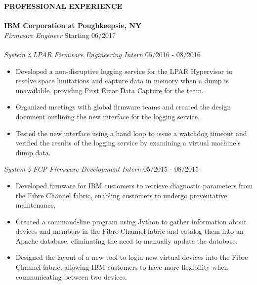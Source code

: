 \documentclass[10.5pt]{res}
\newcommand{\sectionSpace}{\vspace{-3pt}}
\newcommand{\itemSpace}{\vspace{-8pt}}
\begin{document}
\begin{resume}
\textbf{PROFESSIONAL EXPERIENCE} \\ [-10.5pt]
\makebox[\linewidth]{\rule{\textwidth}{0.4pt}}\\
\textbf{IBM Corporation at Poughkeepsie, NY} \\
{\it Firmware Engineer} \hfill Starting 06/2017 \\
{\vspace{-11pt}} \\
{\it System z LPAR Firmware Engineering Intern} \hfill 05/2016 - 08/2016 \\ [-11pt]  
	\begin{itemize} \itemsep -1pt %
	\item  Developed a non-disruptive logging service for the LPAR Hypervisor to resolve space limitations and capture data in memory when a dump is unavailable, providing First Error Data Capture for the team.  
 	\item Organized meetings with global firmware teams and created the design document outlining the new interface for the logging service.         
	\item Tested the new interface using a hand loop to issue a watchdog timeout and verified the results of the logging service by examining a virtual machine’s dump data.
	\end{itemize}
	\itemSpace
{\it System z FCP Firmware Development Intern} \hfill 05/2015 - 08/2015 \\ [-11pt]  
	\begin{itemize} \itemsep -1pt %
	\item Developed firmware for IBM customers to retrieve diagnostic parameters from the Fibre Channel fabric, enabling customers to undergo preventative maintenance. 
 	\item Created a command-line program using Jython to gather information about devices and members in the Fibre Channel fabric and catalog them into an Apache database, eliminating the need to manually update the database.
	\item Designed the layout of a new tool to login new virtual devices into the Fibre Channel fabric, allowing IBM customers to have more flexibility when communicating between two devices.
	\end{itemize}
	\sectionSpace


\end{resume}
\end{document}
